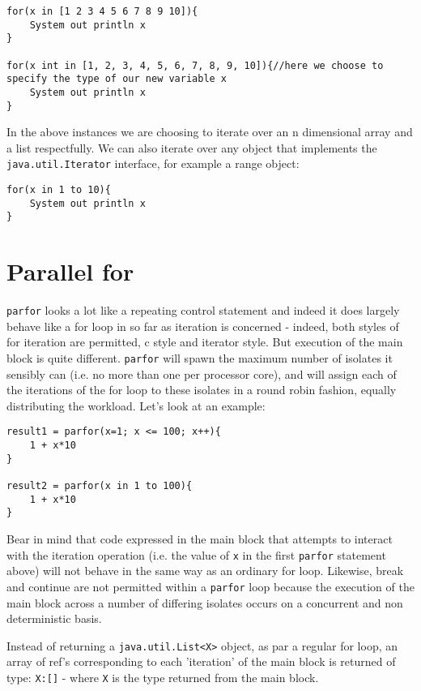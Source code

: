 \documentclass[conc-doc]{subfiles}
\begin{document}
\begin{lstlisting}
for(x in [1 2 3 4 5 6 7 8 9 10]){
	System out println x
}

for(x int in [1, 2, 3, 4, 5, 6, 7, 8, 9, 10]){//here we choose to specify the type of our new variable x
	System out println x
}
\end{lstlisting}

In the above instances we are choosing to iterate over an n dimensional array and a list respectfully. We can also iterate over any object that implements the \lstinline{java.util.Iterator} interface, for example a range object:

\begin{lstlisting}
for(x in 1 to 10){
	System out println x
}
\end{lstlisting}

\section{Parallel for}
\lstinline{parfor} looks a lot like a repeating control statement and indeed it does largely behave like a for loop in so far as iteration is concerned - indeed, both styles of for iteration are permitted, c style and iterator style. But execution of the main block is quite different. \lstinline{parfor} will spawn the maximum number of isolates it sensibly can (i.e. no more than one per processor core), and will assign each of the iterations of the for loop to these isolates in a round robin fashion, equally distributing the workload. Let's look at an example:

\begin{lstlisting}
result1 = parfor(x=1; x <= 100; x++){
	1 + x*10
}

result2 = parfor(x in 1 to 100){
	1 + x*10
}
\end{lstlisting}

Bear in mind that code expressed in the main block that attempts to interact with the iteration operation (i.e. the value of \lstinline{x} in the first \lstinline{parfor} statement above) will not behave in the same way as an ordinary for loop. Likewise, break and continue are not permitted within a \lstinline{parfor} loop because the execution of the main block across a number of differing isolates occurs on a concurrent and non deterministic basis.

Instead of returning a \lstinline{java.util.List<X>} object, as par a regular for loop, an array of ref's corresponding to each 'iteration' of the main block is returned of type: \lstinline{X:[]} - where \lstinline{X} is the type returned from the main block.
\end{document}
